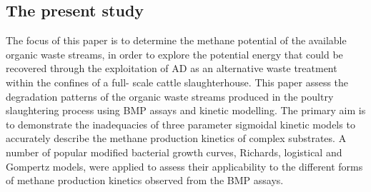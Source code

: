 \subsection{The present study}
The focus of this paper is to determine the methane potential of the available organic waste streams, in order to explore the potential energy that could be recovered through the exploitation of AD as an alternative waste treatment within the confines of a full- scale cattle slaughterhouse. This paper assess the degradation patterns of the organic waste streams produced in the poultry slaughtering process using BMP assays and kinetic modelling. The primary aim is to demonstrate the inadequacies of three parameter sigmoidal kinetic models to accurately describe the methane production kinetics of complex substrates. A number of popular modified bacterial growth curves, Richards, logistical and Gompertz models, were applied to assess their applicability to the different forms of methane production kinetics observed from the BMP assays.
